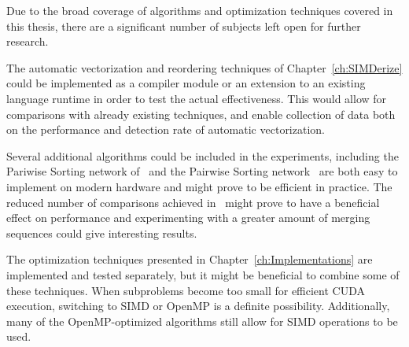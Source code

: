 Due to the broad coverage of algorithms and optimization techniques covered in this thesis, there are a significant number of subjects left open for further research.

The automatic vectorization and reordering techniques of Chapter~\ref{ch:SIMDerize} could be implemented as a compiler module or an extension to an existing language runtime in order to test the actual effectiveness. This would allow for comparisons with already existing techniques, and enable collection of data both on the performance and detection rate of automatic vectorization.

Several additional algorithms could be included in the experiments, including the Pariwise Sorting network of~ and the Pairwise Sorting network~ are both easy to implement on modern hardware and might prove to be efficient in practice. The reduced number of comparisons achieved in~ might prove to have a beneficial effect on performance and experimenting with a greater amount of merging sequences could give interesting results.

The optimization techniques presented in Chapter~\ref{ch:Implementations} are implemented and tested separately, but it might be beneficial to combine some of these techniques. When subproblems become too small for efficient CUDA execution, switching to SIMD or OpenMP is a definite possibility. Additionally, many of the OpenMP-optimized algorithms still allow for SIMD operations to be used.


